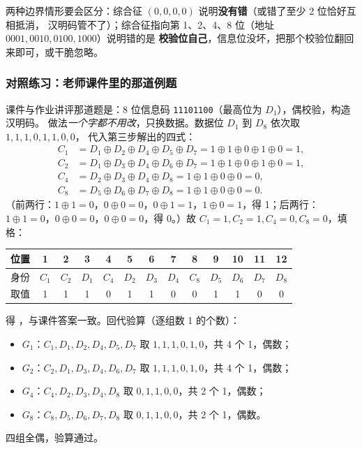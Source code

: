 两种边界情形要会区分：综合征 $(0,0,0,0)$ 说明\textbf{没有错}（或错了至少 2 位恰好互相抵消，
汉明码管不了）；综合征指向第 1、2、4、8 位（地址 $0001,0010,0100,1000$）说明错的是
\textbf{校验位自己}，信息位没坏，把那个校验位翻回来即可，或干脆忽略。

\subsubsection{对照练习：老师课件里的那道例题}

课件与作业讲评那道题是：8 位信息码 \texttt{11101100}（最高位为 $D_1$），偶校验，构造汉明码。
做法\emph{一个字都不用改}，只换数据。数据位 $D_1$ 到 $D_8$ 依次取 $1,1,1,0,1,1,0,0$，
代入第三步解出的四式：
\begin{align*}
C_1&=D_1\oplus D_2\oplus D_4\oplus D_5\oplus D_7=1\oplus1\oplus0\oplus1\oplus0=1,\\
C_2&=D_1\oplus D_3\oplus D_4\oplus D_6\oplus D_7=1\oplus1\oplus0\oplus1\oplus0=1,\\
C_4&=D_2\oplus D_3\oplus D_4\oplus D_8=1\oplus1\oplus0\oplus0=0,\\
C_8&=D_5\oplus D_6\oplus D_7\oplus D_8=1\oplus1\oplus0\oplus0=0 .
\end{align*}
（前两行：$1\oplus1=0$，$0\oplus0=0$，$0\oplus1=1$，$1\oplus0=1$，得 1；后两行：
$1\oplus1=0$，$0\oplus0=0$，$0\oplus0=0$，得 0。）故 $C_1=1,C_2=1,C_4=0,C_8=0$，填格：

\begin{center}\small
\setlength{\tabcolsep}{4pt}
\begin{tabular}{@{}l*{12}{c}@{}}
\toprule
位置 & 1&2&3&4&5&6&7&8&9&10&11&12\\
\midrule
身份 & $C_1$&$C_2$&$D_1$&$C_4$&$D_2$&$D_3$&$D_4$&$C_8$&$D_5$&$D_6$&$D_7$&$D_8$\\
取值 & 1&1&1&0&1&1&0&0&1&1&0&0\\
\bottomrule
\end{tabular}
\end{center}

得 ，与课件答案一致。回代验算（逐组数 1 的个数）：
\begin{itemize}[leftmargin=1.6em,itemsep=0pt]
  \item $G_1$：$C_1,D_1,D_2,D_4,D_5,D_7$ 取 $1,1,1,0,1,0$，共 4 个 1，偶数；
  \item $G_2$：$C_2,D_1,D_3,D_4,D_6,D_7$ 取 $1,1,1,0,1,0$，共 4 个 1，偶数；
  \item $G_4$：$C_4,D_2,D_3,D_4,D_8$ 取 $0,1,1,0,0$，共 2 个 1，偶数；
  \item $G_8$：$C_8,D_5,D_6,D_7,D_8$ 取 $0,1,1,0,0$，共 2 个 1，偶数。
\end{itemize}
四组全偶，验算通过。

